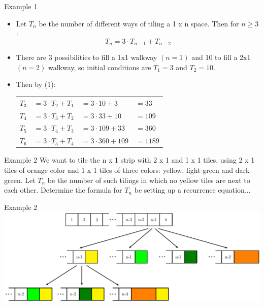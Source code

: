 \documentclass{beamer}
\begin{document}
\begin{frame}{Example 1}
    \begin{itemize}
        \item Let $T_n$ be the number of different ways of tiling a 1 x n space. Then for $n \geq 3$:
        \begin{equation}\tag{1}
            T_n = 3 \cdot T_{n-1} + T_{n-2}
        \end{equation}
        \item There are 3 possibilities to fill a 1x1 walkway $(n=1)$ and 10 to fill a 2x1 $(n=2)$ walkway, so initial conditions are  $T_1 = 3$ and  $T_2 = 10$.
        \item Then by (1): \\
            \begin{tabular}{l l l l}
                $T_3$ & $=3 \cdot T_{2} + T_{1}$ & $= 3 \cdot 10  + 3$   & $= 33$   \\
                $T_4$ & $=3 \cdot T_{3} + T_{2}$ & $= 3 \cdot 33  + 10$  & $= 109$  \\
                $T_5$ & $=3 \cdot T_{4} + T_{3}$ & $= 3 \cdot 109 + 33$  & $= 360$  \\
                $T_6$ & $=3 \cdot T_{5} + T_{4}$ & $= 3 \cdot 360 + 109$ & $= 1189$ \\
            \end{tabular}   
    \end{itemize}
\end{frame}

\begin{frame}{Example 2}
We want to tile the n x 1 strip with 2 x 1 and 1 x 1 tiles, using 2 x 1 tiles of orange color and 1 x 1 tiles of three colors: yellow, light-green and dark green.  Let $T_n$ be the number of such tilings in which no yellow tiles are next to each other.  Determine the formula for $T_n$ be setting up a recurrence equation...
\end{frame}

\begin{frame}{Example 2}
    \centering
    \includegraphics[width=1\linewidth]{tiling2}
\end{frame}
\end{document}
